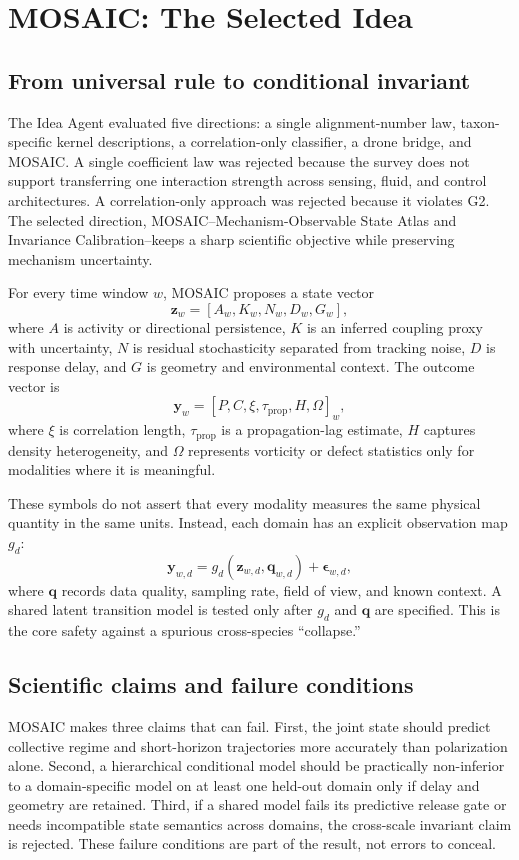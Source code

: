 \documentclass[conference]{../../../../Conference-LaTeX-template_10-17-19/IEEEtran}
\begin{document}
\section{MOSAIC: The Selected Idea}
\subsection{From universal rule to conditional invariant}
The Idea Agent evaluated five directions: a single alignment-number law, taxon-specific kernel descriptions, a correlation-only classifier, a drone bridge, and MOSAIC. A single coefficient law was rejected because the survey does not support transferring one interaction strength across sensing, fluid, and control architectures. A correlation-only approach was rejected because it violates G2. The selected direction, MOSAIC--Mechanism-Observable State Atlas and Invariance Calibration--keeps a sharp scientific objective while preserving mechanism uncertainty.

For every time window $w$, MOSAIC proposes a state vector
\begin{equation}
\mathbf{z}_w=[A_w,K_w,N_w,D_w,G_w],
\end{equation}
where $A$ is activity or directional persistence, $K$ is an inferred coupling proxy with uncertainty, $N$ is residual stochasticity separated from tracking noise, $D$ is response delay, and $G$ is geometry and environmental context. The outcome vector is
\begin{equation}
\mathbf{y}_w=[P,C,\xi,\tau_{\mathrm{prop}},H,\Omega]_w,
\end{equation}
where $\xi$ is correlation length, $\tau_{\mathrm{prop}}$ is a propagation-lag estimate, $H$ captures density heterogeneity, and $\Omega$ represents vorticity or defect statistics only for modalities where it is meaningful.

These symbols do not assert that every modality measures the same physical quantity in the same units. Instead, each domain has an explicit observation map $g_d$:
\begin{equation}
\mathbf{y}_{w,d}=g_d(\mathbf{z}_{w,d},\mathbf{q}_{w,d})+\boldsymbol{\epsilon}_{w,d},
\end{equation}
where $\mathbf{q}$ records data quality, sampling rate, field of view, and known context. A shared latent transition model is tested only after $g_d$ and $\mathbf{q}$ are specified. This is the core safety against a spurious cross-species ``collapse.''

\subsection{Scientific claims and failure conditions}
MOSAIC makes three claims that can fail. First, the joint state should predict collective regime and short-horizon trajectories more accurately than polarization alone. Second, a hierarchical conditional model should be practically non-inferior to a domain-specific model on at least one held-out domain only if delay and geometry are retained. Third, if a shared model fails its predictive release gate or needs incompatible state semantics across domains, the cross-scale invariant claim is rejected. These failure conditions are part of the result, not errors to conceal.
\end{document}
